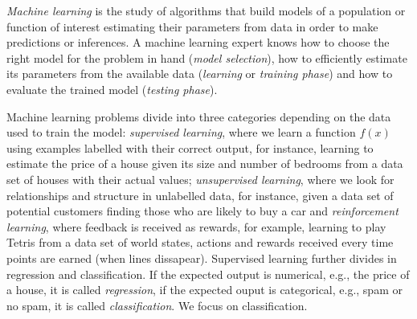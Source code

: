 \emph{Machine learning} is the study of algorithms that build models of a population or function of interest estimating their parameters from data in order to make predictions or inferences. A machine learning expert knows how to choose the right model for the problem in hand (\emph{model selection}), how to efficiently estimate its parameters from the available data (\emph{learning} or \emph{training phase}) and how to evaluate the trained model (\emph{testing phase}).

Machine learning problems divide into three categories depending on the data used to train the model: \emph{supervised learning}, where we learn a function $f(x)$ using examples labelled with their correct output, for instance, learning to estimate the price of a house given its size and number of bedrooms from a data set of houses with their actual values; \emph{unsupervised learning}, where we look for relationships and structure in unlabelled data, for instance, given a data set of potential customers finding those who are likely to buy a car and \emph{reinforcement learning}, where feedback is received as rewards, for example, learning to play Tetris from a data set of world states, actions and rewards received every time points are earned (when lines dissapear). Supervised learning further divides in regression and classification. If the expected output is numerical, e.g., the price of a house, it is called \emph{regression}, if the expected ouput is categorical, e.g., spam or no spam, it is called \emph{classification}. We focus on classification.

